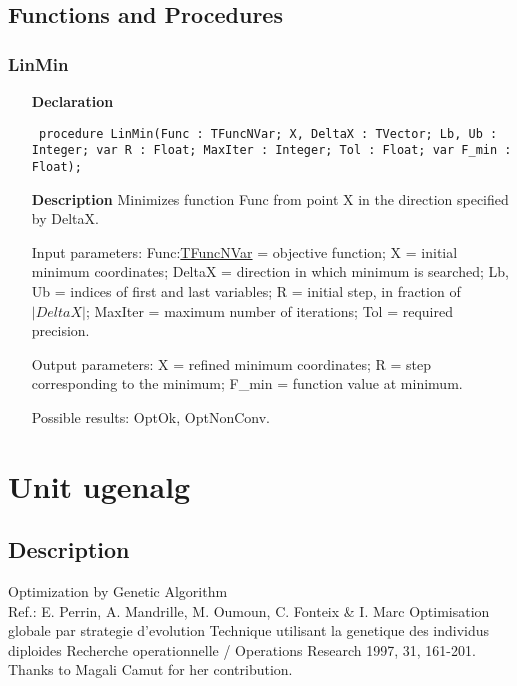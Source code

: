 \documentclass[12pt,a4paper,oneside]{report}
\newcommand{\declarationitem}[1]{\textbf{#1}}
\newcommand{\descriptiontitle}[1]{\textbf{#1}}
\newcommand{\code}[1]{\texttt{#1}}
\begin{document}
\subsection{Functions and Procedures}
\subsubsection{LinMin}
\label{ulinmin-LinMin}
\begin{itemize}\item[\declarationitem{Declaration}\hfill]
	\begin{flushleft}
		\code{
			procedure LinMin(Func : TFuncNVar; X, DeltaX : TVector; Lb, Ub : Integer; var R : Float; MaxIter : Integer; Tol : Float; var F{\_}min : Float);}
		
	\end{flushleft}
	
	\par
	\item[\descriptiontitle{Description}]
	Minimizes function Func from point X in the direction specified by DeltaX.
	
	Input parameters: Func:\hyperref[utypes-TFuncNVar]{TFuncNVar} = objective function; X = initial minimum coordinates; DeltaX = direction in which minimum is searched; Lb, Ub = indices of first and last variables; R = initial step, in fraction of $|DeltaX|$; MaxIter = maximum number of iterations; Tol = required precision.
	
	Output parameters: X = refined minimum coordinates; R = step corresponding to the minimum; F{\_}min = function value at minimum.
	
	Possible results: OptOk, OptNonConv.
	
\end{itemize}


\section{Unit ugenalg}
\label{ugenalg}
\subsection{Description}
Optimization by Genetic Algorithm\\ 
Ref.: E. Perrin, A. Mandrille, M. Oumoun, C. Fonteix {\&} I. Marc Optimisation globale par strategie d'evolution Technique utilisant la genetique des individus diploides Recherche operationnelle / Operations Research 1997, 31, 161{-}201.\\
Thanks to Magali Camut for her contribution.
\end{document}
